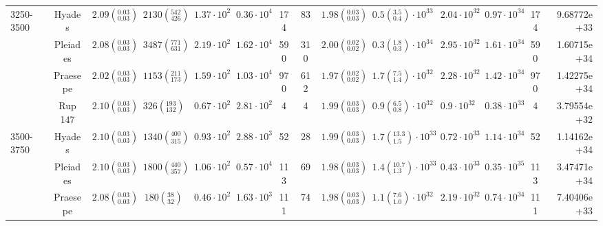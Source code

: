 \begin{tabular}{lccccccccccccr}
3250-3500 & Hyades &  $2.09\left(^{0.03}_{0.03}\right)$ &    $2130\left(^{542}_{426}\right)$ &    $1.37\cdot 10^{2}$ &    $0.36\cdot 10^{4}$ &                174 &                 83 &  $1.98\left(^{0.03}_{0.03}\right)$ &   $0.5\left(^{3.5}_{0.4}\right)\cdot 10^{33}$ &       $2.04\cdot 10^{32}$ &       $0.97\cdot 10^{34}$ &                  174 &          9.68772e+33 \\
          & Pleiades &  $2.08\left(^{0.03}_{0.03}\right)$ &    $3487\left(^{771}_{631}\right)$ &    $2.19\cdot 10^{2}$ &    $1.62\cdot 10^{4}$ &                590 &                310 &  $2.00\left(^{0.02}_{0.02}\right)$ &   $0.3\left(^{1.8}_{0.3}\right)\cdot 10^{34}$ &       $2.95\cdot 10^{32}$ &       $1.61\cdot 10^{34}$ &                  590 &          1.60715e+34 \\
          & Praesepe &  $2.02\left(^{0.03}_{0.03}\right)$ &    $1153\left(^{211}_{173}\right)$ &    $1.59\cdot 10^{2}$ &    $1.03\cdot 10^{4}$ &                970 &                612 &  $1.97\left(^{0.02}_{0.02}\right)$ &   $1.7\left(^{7.5}_{1.4}\right)\cdot 10^{32}$ &       $2.28\cdot 10^{32}$ &       $1.42\cdot 10^{34}$ &                  970 &          1.42275e+34 \\
          & Rup 147 &  $2.10\left(^{0.03}_{0.03}\right)$ &     $326\left(^{193}_{132}\right)$ &    $0.67\cdot 10^{2}$ &    $2.81\cdot 10^{2}$ &                  4 &                  4 &  $1.99\left(^{0.03}_{0.03}\right)$ &   $0.9\left(^{6.5}_{0.8}\right)\cdot 10^{32}$ &        $0.9\cdot 10^{32}$ &       $0.38\cdot 10^{33}$ &                    4 &          3.79554e+32 \\
3500-3750 & Hyades &  $2.10\left(^{0.03}_{0.03}\right)$ &    $1340\left(^{400}_{315}\right)$ &    $0.93\cdot 10^{2}$ &    $2.88\cdot 10^{3}$ &                 52 &                 28 &  $1.99\left(^{0.03}_{0.03}\right)$ &  $1.7\left(^{13.3}_{1.5}\right)\cdot 10^{33}$ &       $0.72\cdot 10^{33}$ &       $1.14\cdot 10^{34}$ &                   52 &          1.14162e+34 \\
          & Pleiades &  $2.10\left(^{0.03}_{0.03}\right)$ &    $1800\left(^{440}_{357}\right)$ &    $1.06\cdot 10^{2}$ &    $0.57\cdot 10^{4}$ &                113 &                 69 &  $1.98\left(^{0.03}_{0.03}\right)$ &  $1.4\left(^{10.7}_{1.3}\right)\cdot 10^{33}$ &       $0.43\cdot 10^{33}$ &       $0.35\cdot 10^{35}$ &                  113 &          3.47471e+34 \\
          & Praesepe &  $2.08\left(^{0.03}_{0.03}\right)$ &       $180\left(^{38}_{32}\right)$ &    $0.46\cdot 10^{2}$ &    $1.63\cdot 10^{3}$ &                111 &                 74 &  $1.98\left(^{0.03}_{0.03}\right)$ &   $1.1\left(^{7.6}_{1.0}\right)\cdot 10^{32}$ &       $2.19\cdot 10^{32}$ &       $0.74\cdot 10^{34}$ &                  111 &          7.40406e+33 \\

\end{tabular}
